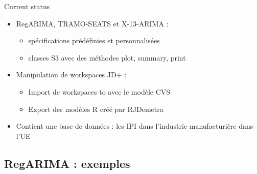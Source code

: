 \documentclass[10pt,xcolor=table,color={dvipsnames,usenames},ignorenonframetext,usepdftitle=false,french]{beamer}
\providecommand{\tightlist}{%
  \setlength{\parskip}{0pt}
  }
\begin{document}
\begin{frame}{Current status}
\protect\hypertarget{current-status-1}{}

\begin{itemize}
\tightlist
\item
  RegARIMA, TRAMO-SEATS et X-13-ARIMA :

  \begin{itemize}
  \tightlist
  \item
    spécifications prédéfinies et personnalisées
  \item
    classes S3 avec des méthodes plot, summary, print
  \end{itemize}
\end{itemize}

\medskip

\begin{itemize}
\tightlist
\item
  Manipulation de workspaces JD+ :

  \begin{itemize}
  \tightlist
  \item
    Import de workspaces to avec le modèle CVS
  \item
    Export des modèles R créé par RJDemetra
  \end{itemize}
\end{itemize}

\medskip

\begin{itemize}
\tightlist
\item
  Contient une base de données : les IPI dans l'industrie manufacturière
  dans l'UE
\end{itemize}

\end{frame}

\hypertarget{regarima-exemples}{%
\subsection{RegARIMA : exemples}\label{regarima-exemples}}
\end{document}
